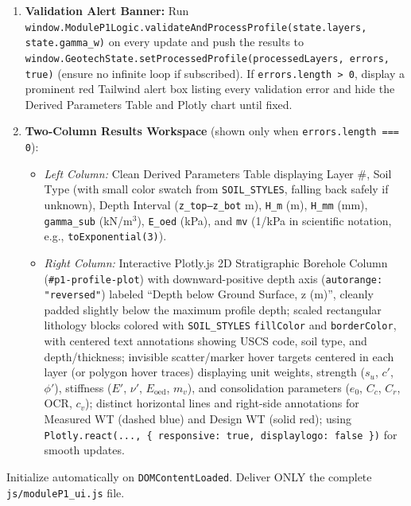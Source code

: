 \documentclass[11pt,a4paper]{article}
\newcommand{\code}[1]{\texttt{\small #1}}
\begin{document}
\begin{prompt}
\begin{enumerate}
  \emph{IMPORTANT UX DETAIL:} Do NOT destroy and re-render the entire input table DOM on every keystroke while the user
  is typing in a numeric cell (which causes focus loss). Update only the KPI cards, validation box, derived table, and
  Plotly chart on input/change events, and re-render the input table only on initial load, Add Layer, Delete Layer,
  or Reset.
\item \textbf{Validation Alert Banner:} Run
  \code{window.ModuleP1Logic.validateAndProcessProfile(state.layers, state.gamma\_w)} on every update and push the
  results to \code{window.GeotechState.setProcessedProfile(processedLayers, errors, true)} (ensure no infinite loop if
  subscribed). If \code{errors.length > 0}, display a prominent red Tailwind alert box listing every validation error
  and hide the Derived Parameters Table and Plotly chart until fixed.
\item \textbf{Two-Column Results Workspace} (shown only when \code{errors.length === 0}):
  \begin{itemize}
  \item \emph{Left Column:} Clean Derived Parameters Table displaying Layer \#, Soil Type (with small color swatch
    from \code{SOIL\_STYLES}, falling back safely if unknown), Depth Interval (\code{z\_top--z\_bot} m), \code{H\_m}
    (m), \code{H\_mm} (mm), \code{gamma\_sub} (kN/m$^3$), \code{E\_oed} (kPa), and \code{mv} (1/kPa in scientific
    notation, e.g., \code{toExponential(3)}).
  \item \emph{Right Column:} Interactive Plotly.js 2D Stratigraphic Borehole Column (\code{\#p1-profile-plot}) with
    downward-positive depth axis (\code{autorange: "reversed"}) labeled ``Depth below Ground Surface, z (m)'', cleanly
    padded slightly below the maximum profile depth; scaled rectangular lithology blocks colored with
    \code{SOIL\_STYLES} \code{fillColor} and \code{borderColor}, with centered text annotations showing USCS code,
    soil type, and depth/thickness; invisible scatter/marker hover targets centered in each layer (or polygon hover
    traces) displaying unit weights, strength ($s_u$, $c'$, $\phi'$), stiffness ($E'$, $\nu'$, $E_\text{oed}$,
    $m_v$), and consolidation parameters ($e_0$, $C_c$, $C_r$, OCR, $c_v$); distinct horizontal lines and right-side
    annotations for Measured WT (dashed blue) and Design WT (solid red); using
    \code{Plotly.react(..., \{ responsive: true, displaylogo: false \})} for smooth updates.
  \end{itemize}
\end{enumerate}
Initialize automatically on \code{DOMContentLoaded}. Deliver ONLY the complete \code{js/moduleP1\_ui.js} file.
\end{prompt}
\end{document}
